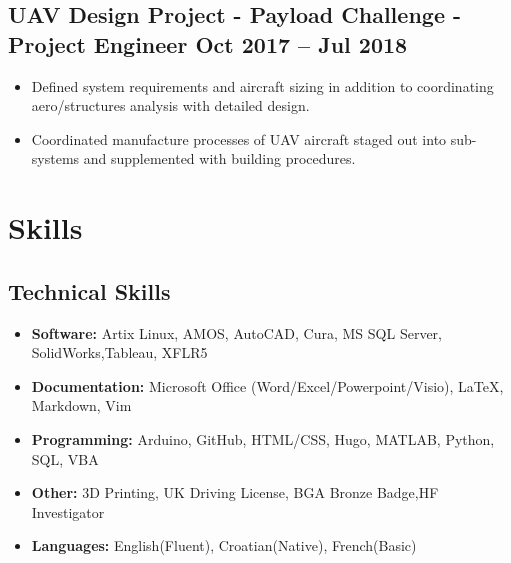 \documentclass[a4paper,9pt]{article}
\begin{document}
\subsection*{\textbf{UAV Design Project - Payload Challenge - Project Engineer } \hfill  Oct 2017 – Jul 2018}

\begin{itemize}[noitemsep]
	\item Defined system requirements and aircraft sizing in addition to coordinating aero/structures analysis with detailed design.
	\item Coordinated manufacture processes of UAV aircraft staged out into sub-systems and supplemented with building procedures.

\end{itemize}
%
%
%

\section*{Skills}
\subsection*{Technical Skills}
\begin{itemize}[noitemsep]
    \item \textbf{Software:} Artix Linux, AMOS,  AutoCAD, Cura, MS SQL Server, SolidWorks,Tableau, XFLR5
    \item \textbf{Documentation:}  Microsoft Office (Word/Excel/Powerpoint/Visio), LaTeX, Markdown, Vim
    \item \textbf{Programming:}  Arduino, GitHub, HTML/CSS, Hugo, MATLAB, Python, SQL, VBA
    \item \textbf{Other:} 3D Printing, UK Driving License, BGA Bronze Badge,HF Investigator
    \item \textbf{Languages:} English(Fluent), Croatian(Native), French(Basic)
\end{itemize}




\date{}
\end{document}
